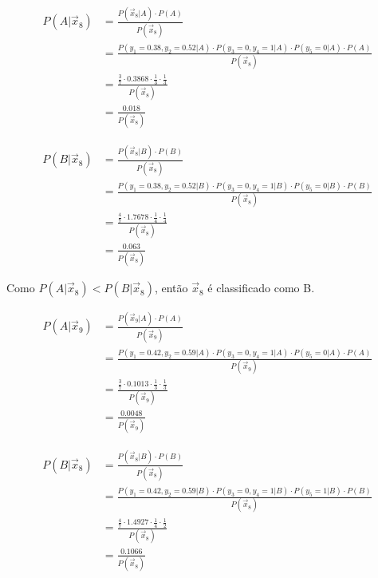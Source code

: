 \documentclass[a4paper,12pt]{article} %
\begin{document}
\begin{enumerate}
\begin{enumerate}
\begin{equation*}
    \begin{aligned}
        P(A|\vec{x}_8) & = \frac{P(\vec{x}_8|A) \cdot P(A)}{P(\vec{x}_8)} \\
                       & = \frac{P(y_1=0.38,y_2=0.52|A) \cdot P(y_3=0,y_4=1|A) \cdot P(y_5=0|A) \cdot P(A)}{P(\vec{x}_8)} \\
                       & = \frac{\frac{3}{7} \cdot 0.3868 \cdot \frac{1}{3} \cdot \frac{1}{3}}{P(\vec{x}_8)} \\
                       & = \frac{0.018}{P(\vec{x}_8)}
    \end{aligned}
\end{equation*}
    
\begin{equation*}
    \begin{aligned}
        P(B|\vec{x}_8) & = \frac{P(\vec{x}_8|B) \cdot P(B)}{P(\vec{x}_8)} \\
                       & = \frac{P(y_1=0.38,y_2=0.52|B) \cdot P(y_3=0,y_4=1|B) \cdot P(y_5=0|B) \cdot P(B)}{P(\vec{x}_8)} \\
                       & = \frac{\frac{4}{7} \cdot 1.7678 \cdot \frac{1}{4} \cdot \frac{1}{4}}{P(\vec{x}_8)} \\
                       & = \frac{0.063}{P(\vec{x}_8)}
    \end{aligned}
\end{equation*}

Como $P(A|\vec{x}_8) < P(B|\vec{x}_8)$, então $\vec{x}_8$ é classificado como B.

\begin{equation*}
    \begin{aligned}
        P(A|\vec{x}_9) & = \frac{P(\vec{x}_9|A) \cdot P(A)}{P(\vec{x}_9)} \\
                       & = \frac{P(y_1=0.42,y_2=0.59|A) \cdot P(y_3=0,y_4=1|A) \cdot P(y_5=0|A) \cdot P(A)}{P(\vec{x}_9)} \\
                       & = \frac{\frac{3}{7} \cdot 0.1013 \cdot \frac{1}{3} \cdot \frac{1}{3}}{P(\vec{x}_9)} \\
                       & = \frac{0.0048}{P(\vec{x}_9)}
    \end{aligned}
\end{equation*}
    
\begin{equation*}
    \begin{aligned}
        P(B|\vec{x}_8) & = \frac{P(\vec{x}_8|B) \cdot P(B)}{P(\vec{x}_8)} \\
                       & = \frac{P(y_1=0.42,y_2=0.59|B) \cdot P(y_3=0,y_4=1|B) \cdot P(y_5=1|B) \cdot P(B)}{P(\vec{x}_8)} \\
                       & = \frac{\frac{4}{7} \cdot 1.4927 \cdot \frac{1}{4} \cdot \frac{1}{2}}{P(\vec{x}_8)} \\
                       & = \frac{0.1066}{P(\vec{x}_8)}
    \end{aligned}
\end{equation*}


\end{enumerate}
\end{enumerate}
\end{document}
